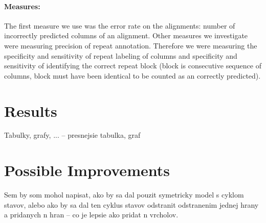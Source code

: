 \paragraph{Measures:} The first measure we use was the error rate on the
alignments: number of incorrectly predicted columns of an alignment. Other
measures we investigate were measuring precision of repeat annotation. Therefore 
we were measuring the specificity and sensitivity of repeat labeling of columns
and specificity and sensitivity of identifying the correct repeat block (block
is consecutive sequence of columns, block must have been identical to be
counted as an correctly predicted).

\section{Results}
\begin{reformulate*}
Tabulky, grafy, ... -- presnejsie tabulka, graf
\end{reformulate*}

\section{Possible Improvements}

\begin{reformulate*}
Sem by som mohol napisat, ako by sa dal pouzit symetricky model s cyklom
stavov, alebo ako by sa dal ten cyklus stavov odstranit odstranenim jednej
hrany a pridanych n hran -- co je lepsie ako pridat n vrcholov.
\end{reformulate*}

\label{LastPage}
